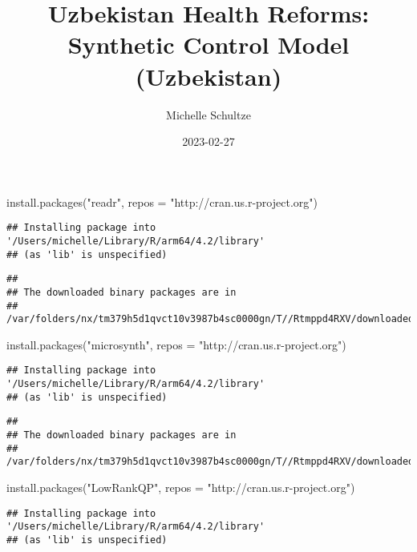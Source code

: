 \documentclass[
]{article}
\title{Uzbekistan Health Reforms: Synthetic Control Model (Uzbekistan)}
\author{Michelle Schultze}
\date{2023-02-27}
\newenvironment{Shaded}{\begin{snugshade}}{\end{snugshade}}
\newcommand{\AttributeTok}[1]{\textcolor[rgb]{0.77,0.63,0.00}{#1}}
\newcommand{\FunctionTok}[1]{\textcolor[rgb]{0.00,0.00,0.00}{#1}}
\newcommand{\NormalTok}[1]{#1}
\newcommand{\StringTok}[1]{\textcolor[rgb]{0.31,0.60,0.02}{#1}}
\begin{document}
\maketitle

\begin{Shaded}
\begin{Highlighting}[]
\FunctionTok{install.packages}\NormalTok{(}\StringTok{"readr"}\NormalTok{, }\AttributeTok{repos =} \StringTok{"http://cran.us.r{-}project.org"}\NormalTok{)}
\end{Highlighting}
\end{Shaded}

\begin{verbatim}
## Installing package into '/Users/michelle/Library/R/arm64/4.2/library'
## (as 'lib' is unspecified)
\end{verbatim}

\begin{verbatim}
## 
## The downloaded binary packages are in
##  /var/folders/nx/tm379h5d1qvct10v3987b4sc0000gn/T//Rtmppd4RXV/downloaded_packages
\end{verbatim}

\begin{Shaded}
\begin{Highlighting}[]
\FunctionTok{install.packages}\NormalTok{(}\StringTok{"microsynth"}\NormalTok{, }\AttributeTok{repos =} \StringTok{"http://cran.us.r{-}project.org"}\NormalTok{)}
\end{Highlighting}
\end{Shaded}

\begin{verbatim}
## Installing package into '/Users/michelle/Library/R/arm64/4.2/library'
## (as 'lib' is unspecified)
\end{verbatim}

\begin{verbatim}
## 
## The downloaded binary packages are in
##  /var/folders/nx/tm379h5d1qvct10v3987b4sc0000gn/T//Rtmppd4RXV/downloaded_packages
\end{verbatim}

\begin{Shaded}
\begin{Highlighting}[]
\FunctionTok{install.packages}\NormalTok{(}\StringTok{"LowRankQP"}\NormalTok{, }\AttributeTok{repos =} \StringTok{"http://cran.us.r{-}project.org"}\NormalTok{)}
\end{Highlighting}
\end{Shaded}

\begin{verbatim}
## Installing package into '/Users/michelle/Library/R/arm64/4.2/library'
## (as 'lib' is unspecified)
\end{verbatim}
\end{document}
